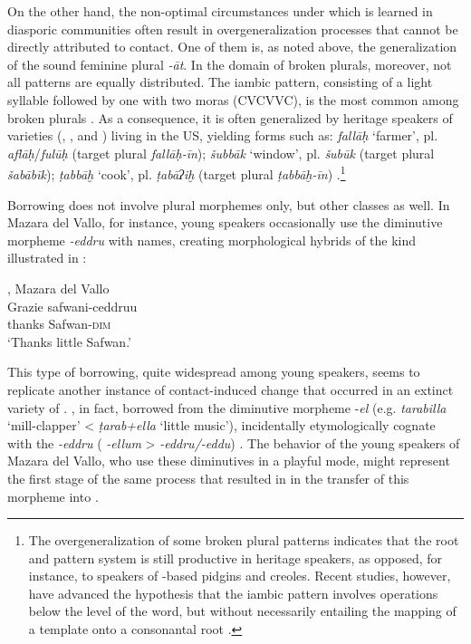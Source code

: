 \documentclass[output=paper]{langsci/langscibook}
\begin{document}
On the other hand, the non-optimal circumstances under which  is learned in diasporic communities often result in overgeneralization processes that cannot be directly attributed to contact. One of them is, as noted above, the generalization of the sound feminine plural \textit{{}-āt}. In the domain of broken plurals, moreover, not all patterns are equally distributed. The iambic pattern, consisting of a light syllable followed by one with two moras (CVCVVC), is the most common among  broken plurals \citep[857]{AlbiriniBenmamoun2014}. As a consequence, it is often generalized by {heritage speakers} of  varieties (, ,  and ) living in the US, yielding forms such as: \textit{fallāḥ} ‘farmer’, pl. \textit{aflāḥ}/\textit{fulūḥ} (target plural \textit{fallāḥ-īn}); \textit{šubbāk} ‘window’, pl. \textit{šubūk} (target plural \textit{šabābīk}); \textit{ṭabbāḫ} ‘cook’, pl. \textit{ṭabāʔiḫ} (target plural \textit{ṭabbāḫ-īn}) \citep[865]{AlbiriniBenmamoun2014}.\footnote{The overgeneralization of some {broken plural} patterns indicates that the {root and pattern} system is still productive in {heritage speakers}, as opposed, for instance, to speakers of -based pidgins and creoles. Recent studies, however, have advanced the hypothesis that the iambic pattern involves operations below the level of the word, but without necessarily entailing the mapping of a template onto a consonantal {root} \citep[112]{AlbiriniSaadah2014}.} 

Borrowing does not involve plural morphemes only, but other classes as well. In {Mazara del Vallo}, for instance, young speakers occasionally use the  {diminutive} morpheme \textit{{}-eddru} with  names, creating morphological hybrids of the kind illustrated in   : 

\ea\label{maz1}
{ , {Mazara del Vallo} \citep[107]{Danna2017book}}\\
\gll Grazie safwani-ceddruu\footnotemark\\
     thanks Safwan-\textsc{dim}\\
\glt `Thanks little Safwan.'
\z

This type of borrowing, quite widespread among young speakers, seems to replicate another instance of contact-induced change that occurred in an extinct variety of .  , in fact, borrowed from  the {diminutive} morpheme -\textit{el} (e.g. \textit{tarabilla} ‘mill-clapper’ < \textit{ṭarab+ella} ‘little music’), incidentally etymologically {cognate} with the  \textit{{}-eddru} ( \textit{-ellum} >  \textit{-eddru/-eddu}) \citep[60]{Andalusi2013}. The behavior of the young  speakers of {Mazara del Vallo}, who use these  diminutives in a playful mode, might represent the first stage of the same process that resulted in in the {transfer} of this morpheme into   \citep[108]{Danna2017book}.
\end{document}
